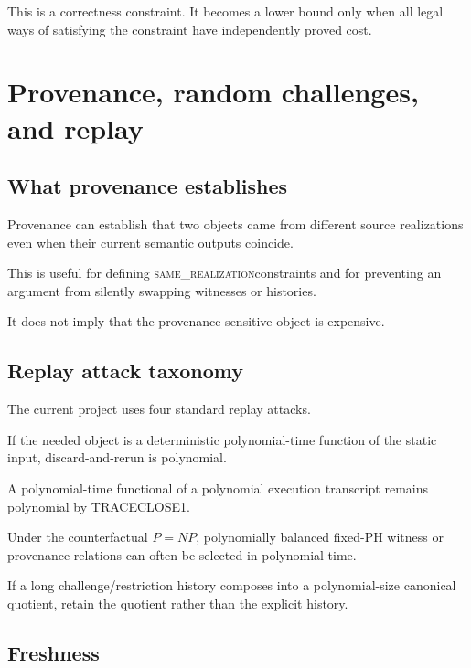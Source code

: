 \documentclass[11pt]{article}
\newcommand{\same}{\textsc{same\_realization}}
\theoremstyle{plain}
\theoremstyle{definition}
\theoremstyle{remark}
\begin{document}
This is a correctness constraint. It becomes a lower bound only when all legal
ways of satisfying the constraint have independently proved cost.

\section{Provenance, random challenges, and replay}

\subsection{What provenance establishes}

Provenance can establish that two objects came from different source
realizations even when their current semantic outputs coincide.

This is useful for defining \same constraints and for preventing an argument
from silently swapping witnesses or histories.

It does not imply that the provenance-sensitive object is expensive.

\subsection{Replay attack taxonomy}

The current project uses four standard replay attacks.

\begin{description}[leftmargin=1.7em,style=nextline]
\item[Deterministic rerun]
If the needed object is a deterministic polynomial-time function of the static
input, discard-and-rerun is polynomial.

\item[Transcript regeneration]
A polynomial-time functional of a polynomial execution transcript remains
polynomial by TRACECLOSE1.

\item[Collapse/selection replacement]
Under the counterfactual $P=NP$, polynomially balanced fixed-PH witness or
provenance relations can often be selected in polynomial time.

\item[Compositional quotient]
If a long challenge/restriction history composes into a polynomial-size
canonical quotient, retain the quotient rather than the explicit history.
\end{description}

\subsection{Freshness}
\end{document}
